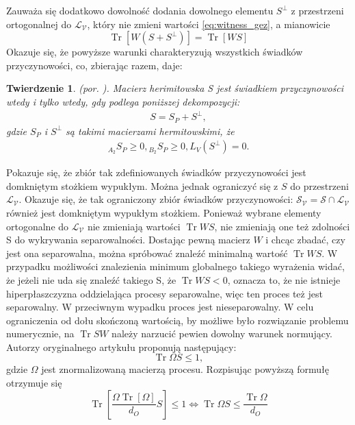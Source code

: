 \documentclass[10pt]{article} %
\newtheorem{tw}{Twierdzenie}
\DeclareMathOperator{\Trs}{Tr}
\begin{document}
Zauważa się dodatkowo dowolność dodania dowolnego elementu $S^\bot$ z przestrzeni ortogonalnej do $\mathcal{L_V}$, który nie zmieni wartości \eqref{eq:witness_gez}, a mianowicie
\begin{equation}
\Trs\left[W\left(S + S^\bot\right)\right] = \Trs\left[WS\right]
\end{equation}
Okazuje się, że powyższe warunki charakteryzują wszystkich świadków przyczynowości, co, zbierając razem, daje:
\begin{tw}
(por. \cite{causal_witness}).
Macierz herimitowska S jest świadkiem przyczynowości wtedy i tylko wtedy, gdy podlega poniższej dekompozycji:
\begin{gather}
S = S_P + S^\bot,
\end{gather}
gdzie $S_P$ i $S^\bot$ są takimi macierzami hermitowskimi, że
\begin{gather}
{}_{A_2} S_P \geq 0, {}_{B_2} S_P \geq 0, L_V(S^\bot) = 0.
\end{gather}
\end{tw}
Pokazuje się, że zbiór tak zdefiniowanych świadków przyczynowości jest domkniętym stożkiem wypukłym. Można jednak ograniczyć się z $S$ do przestrzeni 
$\mathcal{L_V}$. Okazuje się, że tak ograniczony zbiór świadków przyczynowości: $\mathcal{S_V} = \mathcal{S} \cap \mathcal{L_V}$ również jest domkniętym wypukłym stożkiem. Ponieważ wybrane elementy ortogonalne do
$\mathcal{L_V}$ nie zmieniają wartości $\Trs WS$, nie zmieniają one też zdolności S do wykrywania separowalności. 
Dostając pewną macierz $W$ i chcąc zbadać, czy jest ona separowalna, można spróbować znaleźć minimalną wartość $\Trs WS$. W przypadku możliwości 
znalezienia minimum globalnego takiego wyrażenia widać, że jeżeli nie uda się znaleźć takiego S, że $\Trs WS < 0$, oznacza to, że nie istnieje hiperpłaszczyzna oddzielająca procesy separowalne, więc ten proces też jest separowalny. W przeciwnym wypadku proces jest nieseparowalny.
W celu ograniczenia od dołu skończoną wartością, by możliwe było rozwiązanie problemu numerycznie, na $\Trs SW$ należy narzucić pewien dowolny warunek normujący.
Autorzy oryginalnego artykułu proponują następujący:
\begin{equation}
\Trs \Omega S \leq 1,
\end{equation}
gdzie $\Omega$ jest znormalizowaną macierzą procesu.
Rozpisując powyższą formułę otrzymuje się
\begin{equation}
\Trs\left[ \frac{\Omega \Trs \left[ \Omega \right]}{d_O}S\right]\leq1 \iff \Trs \Omega S \leq \frac{\Trs \Omega}{d_O}
\end{equation}
\end{document}

